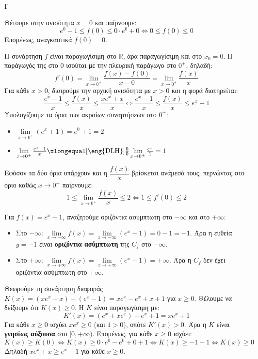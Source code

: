 \begin{thema}{Γ}
\begin{erwthma}
\item Θέτουμε στην ανισότητα $x=0$ και παίρνουμε:
\[e^0 - 1 \le f(0) \le 0 \cdot e^0 + 0 \Leftrightarrow 0 \le f(0) \le 0\]
Επομένως, αναγκαστικά $f(0) = 0$.

Η συνάρτηση $f$ είναι παραγωγίσιμη στο $\mathbb{R}$, άρα παραγωγίσιμη και στο $x_0=0$. Η παράγωγός της στο $0$ ισούται με την πλευρική παράγωγο στο $0^+$, δηλαδή:
\[f'(0) = \lim_{x \to 0^+} \frac{f(x)-f(0)}{x-0} = \lim_{x \to 0^+} \frac{f(x)}{x}\]
Για κάθε $x > 0$, διαιρούμε την αρχική ανισότητα με $x>0$ και η φορά διατηρείται:
\[\frac{e^x - 1}{x} \le \frac{f(x)}{x} \le \frac{x e^x + x}{x} \Leftrightarrow \frac{e^x - 1}{x} \le \frac{f(x)}{x} \le e^x + 1\]
Υπολογίζουμε τα όρια των ακραίων συναρτήσεων στο $0^+$:
\begin{itemize}
  \item $\lim\limits_{x \to 0^+} (e^x + 1) = e^0 + 1 = 2$
  \item $\lim\limits_{x \to 0^+} \frac{e^x - 1}{x} \xlongequal[\text{\eng{DLH}}]{\frac{0}{0}} \lim\limits_{x \to 0^+} \frac{e^x}{1} = 1$
\end{itemize}
Εφόσον τα δύο όρια υπάρχουν και η $\dfrac{f(x)}{x}$ βρίσκεται ανάμεσά τους, περνώντας στο όριο καθώς $x \to 0^+$ παίρνουμε:
\[1 \le \lim_{x \to 0^+} \frac{f(x)}{x} \le 2 \Leftrightarrow 1 \le f'(0) \le 2\]

\item Για $f(x) = e^x - 1$, αναζητούμε οριζόντια ασύμπτωτη στο $-\infty$ και στο $+\infty$:
\begin{itemize}
  \item Στο $-\infty$: $\lim\limits_{x \to -\infty} f(x) = \lim\limits_{x \to -\infty} (e^x - 1) = 0 - 1 = -1$. 
  Άρα η ευθεία $y = -1$ είναι \textbf{οριζόντια ασύμπτωτη} της $C_f$ στο $-\infty$.
  \item Στο $+\infty$: $\lim\limits_{x \to +\infty} f(x) = \lim\limits_{x \to +\infty} (e^x - 1) = +\infty$. 
  Άρα η $C_f$ δεν έχει οριζόντια ασύμπτωτη στο $+\infty$.
\end{itemize}

\item Θεωρούμε τη συνάρτηση διαφοράς $K(x) = (xe^x + x) - (e^x - 1) = xe^x - e^x + x + 1$ για $x \ge 0$. Θέλουμε να δείξουμε ότι $K(x) \ge 0$.
Η $K$ είναι παραγωγίσιμη με:
\[K'(x) = (e^x + xe^x) - e^x + 1 = xe^x + 1\]
Για κάθε $x \ge 0$ ισχύει $xe^x \ge 0$ (και $1>0$), οπότε $K'(x) > 0$. Άρα η $K$ είναι \textbf{γνησίως αύξουσα} στο $[0, +\infty)$.
Επομένως, για κάθε $x \ge 0$ ισχύει:
\[K(x) \ge K(0) \Leftrightarrow K(x) \ge 0\cdot e^0 - e^0 + 0 + 1 \Leftrightarrow K(x) \ge -1 + 1 \Leftrightarrow K(x) \ge 0\]
Δηλαδή $xe^x + x \ge e^x - 1$ για κάθε $x \ge 0$.


\end{erwthma}
\end{thema}
